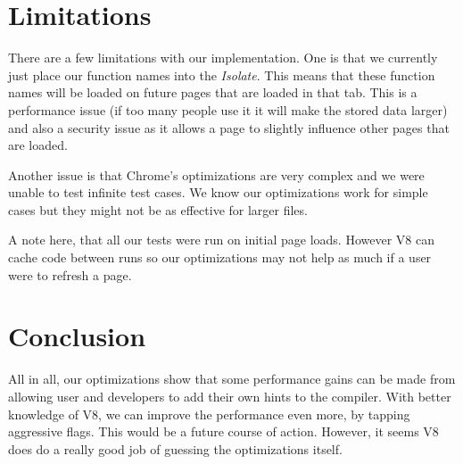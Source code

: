 \documentclass[twocolumn,showpacs,%
  nofootinbib,aps,superscriptaddress,%
  eqsecnum,prd,notitlepage,showkeys,10pt]{revtex4-1}
\begin{document}
\section{Limitations}
There are a few limitations with our implementation. One is that we currently just place our function names into the \textit{Isolate}. This means that these function names will be loaded on future pages that are loaded in that tab. This is a performance issue (if too many people use it it will make the stored data larger) and also a security issue as it allows a page to slightly influence other pages that are loaded.

Another issue is that Chrome's optimizations are very complex and we were unable to test infinite test cases. We know our optimizations work for simple cases but they might not be as effective for larger files. 

A note here, that all our tests were run on initial page loads. However V8 can cache code between runs so our optimizations may not help as much if a user were to refresh a page.


\section{Conclusion}
All in all, our optimizations show that some performance gains can be made from allowing user and developers to add their own hints to the compiler. With better knowledge of V8, we can improve the performance even more, by tapping aggressive flags. This would be a future course of action. However, it seems V8 does do a really good job of guessing the optimizations itself. 





\begin{thebibliography}{9}





\end{thebibliography}
\end{document}
